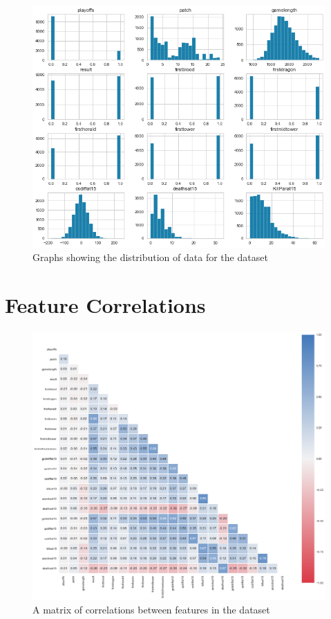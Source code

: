 \begin{figure}[h!]
    \centering
    \includegraphics[width=1\textwidth]{figures/DistributionVisualisation}
    \caption{Graphs showing the distribution of data for the dataset}
    \label{fig:DistroVisual}
\end{figure}

\chapter{Feature Correlations}\label{ch:Feature Correlations}

\begin{figure}[h!]
    \centering
    \includegraphics[width=1\textwidth]{figures/CorrMat1}
    \caption{A matrix of correlations between features in the dataset}
    \label{fig:CorrMat1}
\end{figure}


